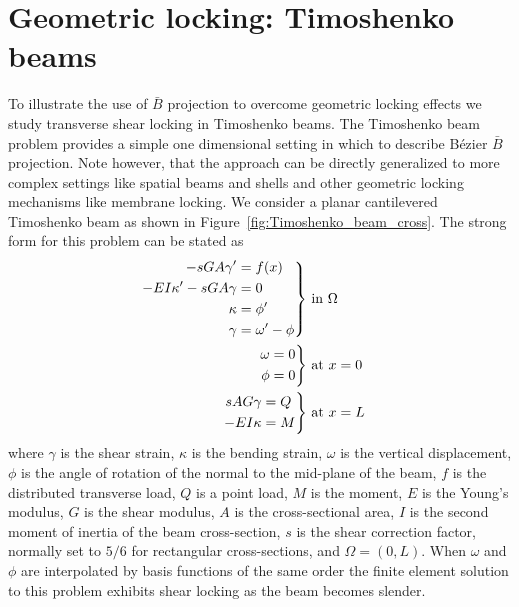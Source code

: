 \section{Geometric locking: Timoshenko beams}
\label{sec:timoshenkobeam}
To illustrate the use of \Bezier $\bar{B}$ projection to overcome geometric locking effects we study transverse shear locking in Timoshenko beams. The Timoshenko beam problem provides a simple one dimensional setting in which to describe B\'ezier $\bar{B}$ projection. Note however, that the approach can be directly generalized to more complex settings like spatial beams and shells and other geometric locking mechanisms like membrane locking. We consider a planar cantilevered Timoshenko beam as shown in Figure~\ref{fig:Timoshenko_beam_cross}. The strong form for this problem can be stated as
\begin{align}
    \begin{rcases}
        \begin{aligned}
            -s{GA}\gamma'          & =f(x)          \\
            -EI\kappa'-s{GA}\gamma & = 0            \\
            \kappa                 & = \phi'        \\
            \gamma                 & = \omega'-\phi
        \end{aligned}
    \end{rcases}
     & \text{ in $\Omega$} \\
    \begin{rcases}
        \begin{aligned}
            \omega & =0 \\
            \phi   & =0
        \end{aligned}
    \end{rcases}
     & \text{ at $x=0$}    \\
    \begin{rcases}
        \begin{aligned}
            s{AG}\gamma & = Q \\
            -EI\kappa   & = M
        \end{aligned}
    \end{rcases}
     & \text{ at $x=L$}
\end{align}
where $\gamma$ is the shear strain, $\kappa$ is the bending strain, $\omega$ is the vertical displacement, $\phi$ is the angle of rotation of the normal to the mid-plane of the beam, $f$ is the distributed transverse load, $Q$ is a point load, $M$ is the moment, $E$ is the Young's modulus, $G$ is the shear modulus, $A$ is the cross-sectional area, $I$ is the second moment of inertia of the beam cross-section, $s$ is the shear correction factor, normally set to $5/6$ for rectangular cross-sections, and $\Omega = (0,L)$. When $\omega$ and $\phi$ are interpolated by basis functions of the same order the finite element solution to this problem exhibits shear locking as the beam becomes slender.

